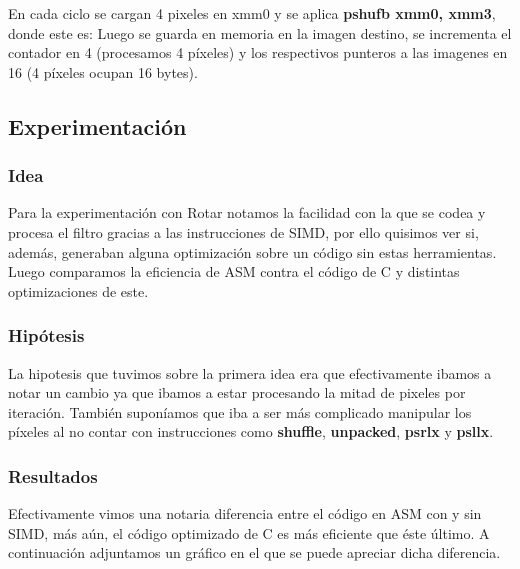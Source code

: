 En cada ciclo se cargan 4 pixeles en xmm0 y se aplica \textbf{pshufb xmm0, xmm3}, donde este es:
Luego se guarda en memoria en la imagen destino, se incrementa el contador en 4 (procesamos 4 píxeles) y los respectivos punteros a las imagenes en 16 (4 píxeles ocupan 16 bytes).	
	
	
\subsection{Experimentación}
\subsubsection{Idea}	


Para la experimentación con Rotar notamos la facilidad con la que se codea y procesa el filtro gracias a las instrucciones de SIMD, por ello quisimos ver si, además, generaban alguna optimización sobre un código sin estas herramientas.
Luego comparamos la eficiencia de ASM contra el código de C y distintas optimizaciones de este.
\subsubsection{Hipótesis}
La hipotesis que tuvimos sobre la primera idea era que efectivamente ibamos a notar un cambio ya que ibamos a estar procesando la mitad de pixeles por iteración. También suponíamos que iba a ser más complicado manipular los píxeles al no contar con instrucciones como \textbf{shuffle}, \textbf{unpacked}, \textbf{psrlx} y \textbf{psllx}.
	
\subsubsection{Resultados}
	Efectivamente vimos una notaria diferencia entre el código en ASM con y sin SIMD, más aún, el código optimizado de C es más eficiente que éste último.
	A continuación adjuntamos un gráfico en el que se puede apreciar dicha diferencia.
	
